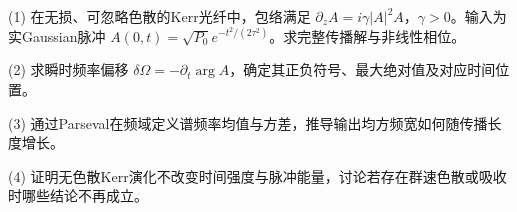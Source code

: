 (1) 在无损、可忽略色散的Kerr光纤中，包络满足 \(\partial_zA=i\gamma|A|^2A\)，\(\gamma>0\)。输入为实Gaussian脉冲 \(A(0,t)=\sqrt{P_0}e^{-t^2/(2\tau^2)}\)。求完整传播解与非线性相位。

(2) 求瞬时频率偏移 \(\delta\Omega=-\partial_t\arg A\)，确定其正负符号、最大绝对值及对应时间位置。

(3) 通过Parseval在频域定义谱频率均值与方差，推导输出均方频宽如何随传播长度增长。

(4) 证明无色散Kerr演化不改变时间强度与脉冲能量，讨论若存在群速色散或吸收时哪些结论不再成立。
